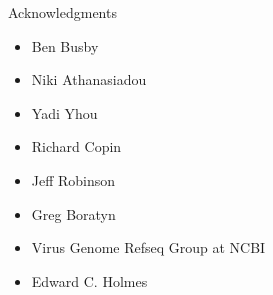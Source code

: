 \documentclass{beamer}
\begin{document}
  \begin{frame}{Acknowledgments}
    \begin{itemize}
      \item Ben Busby
      \item Niki Athanasiadou
      \item Yadi Yhou
      \item Richard Copin
      \item Jeff Robinson
      \item Greg Boratyn
      \item Virus Genome Refseq Group at NCBI
      \item Edward C. Holmes
    \end{itemize}
  \end{frame}
\end{document}
